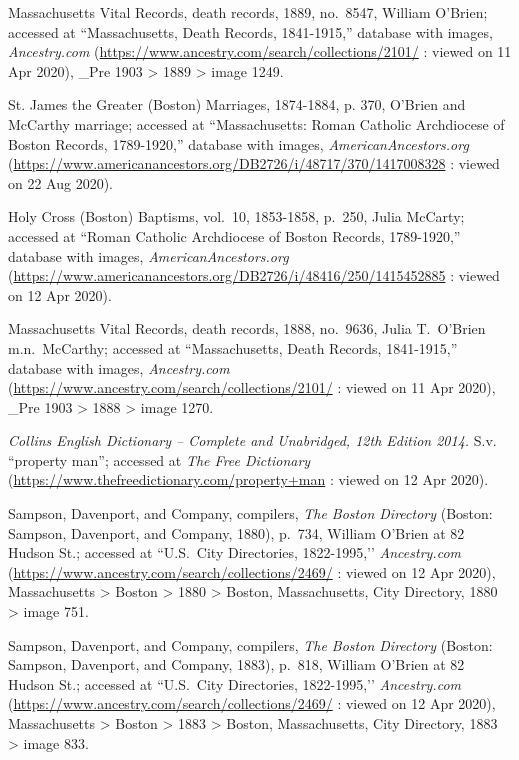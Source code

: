 \begin{thebibliography}{999}
Massachusetts Vital Records, death records, 1889, no.\ 8547, William O'Brien; accessed at ``Massachusetts, Death Records, 1841-1915,'' database with images, \textit{Ancestry.com} (\url{https://www.ancestry.com/search/collections/2101/} : viewed on 11 Apr 2020), \_Pre 1903 > 1889 > image 1249. 

St. James the Greater (Boston) Marriages, 1874-1884, p. 370, O'Brien and McCarthy marriage; accessed at ``Massachusetts: Roman Catholic Archdiocese of Boston Records, 1789-1920,'' database with images, \textit{AmericanAncestors.org} (\url{https://www.americanancestors.org/DB2726/i/48717/370/1417008328} : viewed on 22 Aug 2020).

Holy Cross (Boston) Baptisms, vol.\ 10, 1853-1858, p.\ 250, Julia McCarty; accessed at ``Roman Catholic Archdiocese of Boston Records, 1789-1920,'' database with images, \textit{AmericanAncestors.org} (\url{https://www.americanancestors.org/DB2726/i/48416/250/1415452885} : viewed on 12 Apr 2020).

Massachusetts Vital Records, death records, 1888, no.\ 9636, Julia T.\ O'Brien m.n.\ McCarthy; accessed at ``Massachusetts, Death Records, 1841-1915,'' database with images, \textit{Ancestry.com} (\url{https://www.ancestry.com/search/collections/2101/} : viewed on 11 Apr 2020), \_Pre 1903 > 1888 > image 1270. 

\textit{Collins English Dictionary -- Complete and Unabridged, 12th Edition 2014.} S.v. ``property man''; accessed at \textit{The Free Dictionary} (\url{https://www.thefreedictionary.com/property+man} : viewed on 12 Apr 2020).

Sampson, Davenport, and Company, compilers, \textit{The Boston Directory} (Boston: Sampson, Davenport, and Company, 1880), p.\ 734, William O'Brien at 82 Hudson St.; accessed at ``U.S.\ City Directories, 1822-1995,’’ \textit{Ancestry.com} (\url{https://www.ancestry.com/search/collections/2469/} : viewed on 12 Apr 2020), Massachusetts > Boston > 1880 > Boston, Massachusetts, City Directory, 1880 > image 751.

Sampson, Davenport, and Company, compilers, \textit{The Boston Directory} (Boston: Sampson, Davenport, and Company, 1883), p.\ 818, William O'Brien at 82 Hudson St.; accessed at ``U.S.\ City Directories, 1822-1995,’’ \textit{Ancestry.com} (\url{https://www.ancestry.com/search/collections/2469/} : viewed on 12 Apr 2020), Massachusetts > Boston > 1883 > Boston, Massachusetts, City Directory, 1883 > image 833.


\end{thebibliography}
